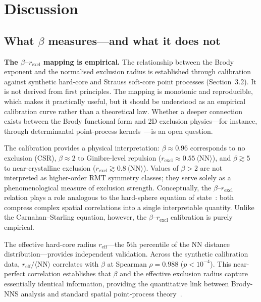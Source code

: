 \documentclass[final,1p,times]{elsarticle}
\theoremstyle{definition}
\begin{document}
\section{Discussion}

\subsection{What $\beta$ measures---and what it does not}

\textbf{The $\beta$--$r_{\text{excl}}$ mapping is empirical.}
The relationship between the Brody exponent and the normalised
exclusion radius is established through calibration against synthetic
hard-core and Strauss soft-core point processes (Section~3.2). It is
not derived from first principles. The mapping is monotonic and
reproducible, which makes it practically useful, but it should be
understood as an empirical calibration curve rather than a theoretical
law. Whether a deeper connection exists between the Brody functional
form and 2D exclusion physics---for instance, through determinantal
point-process kernels~\cite{FORRESTER-2010}---is an open question.

The calibration provides a physical interpretation: $\beta\approx0.96$
corresponds to no exclusion (CSR), $\beta\approx2$ to Ginibre-level
repulsion ($r_{\text{excl}}\approx0.55\,\langle\text{NN}\rangle$),
and $\beta\gtrsim5$ to near-crystalline exclusion
($r_{\text{excl}}\gtrsim0.8\,\langle\text{NN}\rangle$). Values of
$\beta>2$ are not interpreted as higher-order RMT symmetry classes;
they serve solely as a phenomenological measure of exclusion strength.
Conceptually, the $\beta$--$r_{\text{excl}}$ relation plays a role
analogous to the hard-sphere equation of state~\cite{TORQUATO-2002}:
both compress complex spatial correlations into a single interpretable
quantity. Unlike the Carnahan--Starling equation, however, the
$\beta$--$r_{\text{excl}}$ calibration is purely empirical.

The effective hard-core radius $r_{\text{eff}}$---the 5th percentile
of the NN distance distribution---provides independent validation.
Across the synthetic calibration data,
$r_{\text{eff}}/\langle\text{NN}\rangle$ correlates with $\beta$ at
Spearman $\rho=0.988$ ($p<10^{-4}$). This near-perfect correlation
establishes that $\beta$ and the effective exclusion radius capture
essentially identical information, providing the quantitative link
between Brody-NNS analysis and standard spatial point-process
theory~\cite{BADDELEY-2015}.
\end{document}
